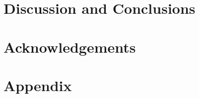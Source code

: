 \documentclass{cmspaper}
\begin{document}
\clearpage
\section{Discussion and Conclusions}

\section{Acknowledgements}

\section{Appendix}
\clearpage
\end{document}
